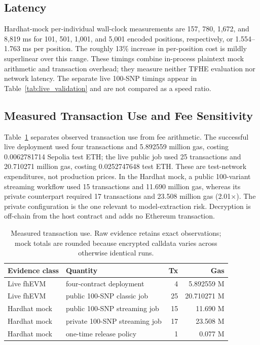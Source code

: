 \documentclass[10pt,twocolumn]{article}
\begin{document}
\subsection{Latency}

Hardhat-mock per-individual wall-clock measurements are 157, 780, 1,672, and
8,819 ms for 101, 501, 1,001, and 5,001 encoded positions, respectively, or
1.554--1.763 ms per position.  The roughly 13\% increase in per-position cost is
mildly superlinear over this range.  These timings combine in-process plaintext mock
arithmetic and transaction overhead; they measure neither TFHE evaluation nor network
latency.  The separate live 100-SNP timings appear in Table~\ref{tab:live_validation}
and are not compared as a speed ratio.

\subsection{Measured Transaction Use and Fee Sensitivity}

Table~\ref{tab:cost} separates observed transaction use from fee arithmetic.  The
successful live deployment used four transactions and 5.892559 million gas, costing
0.0062781714 Sepolia test ETH; the live public job used 25 transactions and 20.710271
million gas, costing 0.0252747648 test ETH.  These are test-network expenditures, not
production prices.  In the Hardhat mock, a public 100-variant streaming workflow used
15 transactions and 11.690 million gas, whereas its private counterpart required 17
transactions and 23.508 million gas (2.01$\times$).  The private configuration is the
one relevant to model-extraction risk.  Decryption is off-chain from the host contract
and adds no Ethereum transaction.

\begin{table}[ht]
\centering
\caption{Measured transaction use.  Raw evidence retains exact observations; mock
totals are rounded because encrypted calldata varies across otherwise identical runs.}
\label{tab:cost}
\footnotesize
\setlength{\tabcolsep}{2pt}
\begin{tabularx}{\columnwidth}{@{}lXrr@{}}
\toprule
\textbf{Evidence class} & \textbf{Quantity} & \textbf{Tx} & \textbf{Gas} \\
\midrule
Live fhEVM & four-contract deployment & 4 & 5.892559 M \\
Live fhEVM & public 100-SNP classic job & 25 & 20.710271 M \\
Hardhat mock & public 100-SNP streaming job & 15 & 11.690 M \\
Hardhat mock & private 100-SNP streaming job & 17 & 23.508 M \\
Hardhat mock & one-time release policy & 1 & 0.077 M \\
\bottomrule
\end{tabularx}
\end{table}
\end{document}
